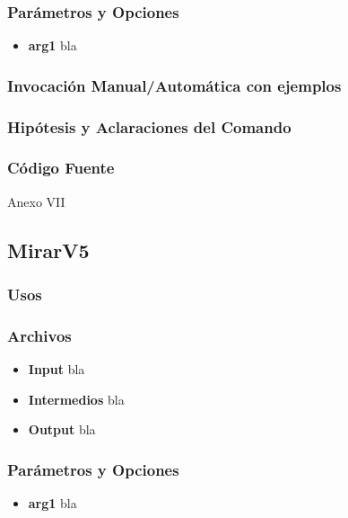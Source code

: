 \documentclass[a4paper,10pt,titlepage]{article}
\begin{document}
		\subsubsection{Par\'ametros y Opciones}
			\begin {itemize}
				\item \textbf{arg1} {bla}
			\end{itemize}
	
		\subsubsection{Invocaci\'on Manual/Autom\'atica con ejemplos}

		\subsubsection{Hip\'otesis y Aclaraciones del Comando}

		\subsubsection{C\'odigo Fuente}
			Anexo VII


	\subsection{MirarV5}
		\subsubsection{Usos}
			 
		\subsubsection{Archivos}
			\begin {itemize}
				\item \textbf{Input} {bla}
				\item \textbf{Intermedios} {bla}
				\item \textbf{Output} {bla}
			\end{itemize}

		\subsubsection{Par\'ametros y Opciones}
			\begin {itemize}
				\item \textbf{arg1} {bla}
			\end{itemize}
	
\end{document}
